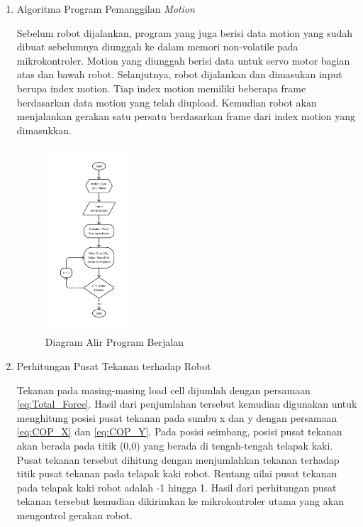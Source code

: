 \begin{enumerate}[label=\Alph*.]
    \item Algoritma Program Pemanggilan \textit{Motion}
    \label{subsec:algoritmamotion}

    \hspace*{1em} Sebelum robot dijalankan, program yang juga berisi data motion yang sudah dibuat sebelumnya diunggah ke dalam memori non-volatile pada  mikrokontroler. Motion yang diunggah berisi data untuk servo motor bagian atas dan bawah robot. Selanjutnya, robot dijalankan dan dimasukan input berupa index motion. Tiap index motion memiliki beberapa frame berdasarkan data motion yang telah diupload. Kemudian robot akan menjalankan gerakan satu persatu berdasarkan frame dari index motion yang dimasukkan.

    \begin{figure} [h]
      \centering
      \includegraphics[width=0.3\textwidth]{gambar/flowchart_play_index.png}
      \caption{Diagram Alir Program Berjalan}
      \label{fig:Algoritma_Berjalan}
    \end{figure}

    \item Perhitungan Pusat Tekanan terhadap Robot
    \label{subsec:perhitunganpusattekanan}

    \hspace*{1em} Tekanan pada masing-masing load cell dijumlah dengan persamaan \ref{eq:Total_Force}. Hasil dari penjumlahan tersebut kemudian digunakan untuk menghitung posisi pusat tekanan pada sumbu x dan y dengan persamaan \ref{eq:COP_X} dan \ref{eq:COP_Y}. Pada posisi seimbang, posisi pusat tekanan akan berada pada titik (0,0) yang berada di tengah-tengah telapak kaki. Pusat tekanan tersebut dihitung dengan menjumlahkan tekanan terhadap titik pusat tekanan pada telapak kaki robot. Rentang nilai pusat tekanan pada telapak kaki robot adalah -1 hingga 1. Hasil dari perhitungan pusat tekanan tersebut kemudian dikirimkan ke mikrokontroler utama yang akan mengontrol gerakan robot. 


\end{enumerate}
